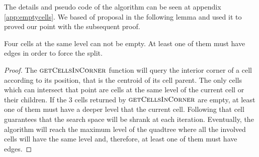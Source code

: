 The details and pseudo code of the algorithm can be seen at appendix \ref{app:emptycells}.  We based of proposal in the following lemma and used it to proved our point with the subsequent proof.

\begin{lemma}
Four cells at the same level can not be empty.  At least one of them must have edges in order to force the split.
\end{lemma}

\begin{proof}
The $\textsc{getCellsInCorner}$ function will query the interior corner of a cell according to its position, that is the centroid of its cell parent.  The only cells which can intersect that point are cells at the same level of the current cell or their children.  If the 3 cells returned by $\textsc{getCellsInCorner}$ are empty, at least one of them must have a deeper level that the current cell.  Following that cell guarantees that the search space will be shrank at each iteration.  Eventually, the algorithm will reach the maximum level of the quadtree where all the involved cells will have the same level and, therefore, at least one of them must have edges.
\end{proof}
